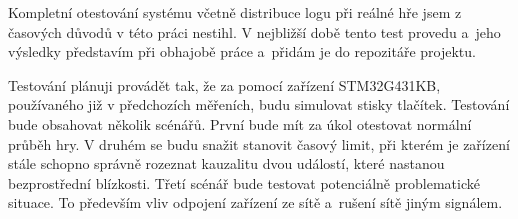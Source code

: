 {\sbf Kompletní otestování systému} včetně distribuce logu při reálné hře jsem z časových důvodů v této práci nestihl. V nejbližší době tento test provedu a~jeho výsledky představím při obhajobě práce a~přidám je do repozitáře projektu.

Testování plánuji provádět tak, že za pomocí zařízení STM32G431KB, používaného již v předchozích měřeních, budu simulovat stisky tlačítek. Testování bude obsahovat několik scénářů. První bude mít za úkol otestovat normální průběh hry. V druhém se budu snažit stanovit časový limit, při kterém je zařízení stále schopno správně rozeznat kauzalitu dvou událostí, které nastanou bezprostřední blízkosti. Třetí scénář bude testovat potenciálně problematické situace. To především vliv odpojení zařízení ze sítě a~rušení sítě jiným signálem.

